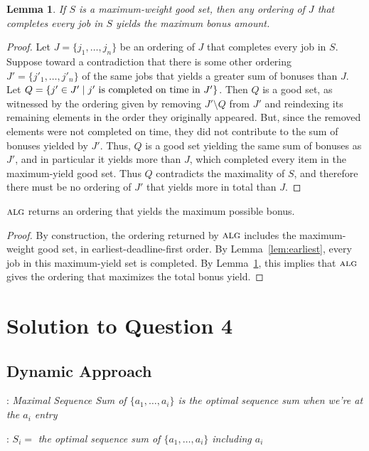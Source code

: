 \documentclass[11pt]{article}
\newcommand{\alg}{\textsc{alg}}
\newtheorem{lemma}[theorem]{Lemma}
\begin{document}
\begin{lemma}\label{lem:max-good-set}
  If $S$ is a maximum-weight good set, then any ordering of $J$ that completes every job in $S$ yields the maximum bonus amount.
\end{lemma}
\begin{proof}
  Let $J = \{j_1, \dots, j_n\}$ be an ordering of $J$ that completes every job in $S$.
  Suppose toward a contradiction that there is some other ordering $J' = \{j'_1, \dots, j'_n\}$ of the same jobs that yields a greater sum of bonuses than $J$.
  Let $Q = \{j' \in J' \mid j' \textnormal{ is completed on time in } J'\}$.
  Then $Q$ is a good set, as witnessed by the ordering given by removing $J' \setminus Q$ from $J'$ and reindexing its remaining elements in the order they originally appeared.
  But, since the removed elements were not completed on time, they did not contribute to the sum of bonuses yielded by $J'$.
  Thus, $Q$ is a good set yielding the same sum of bonuses as $J'$, and in particular it yields more than $J$, which completed every item in the maximum-yield good set.
  Thus $Q$ contradicts the maximality of $S$, and therefore there must be no ordering of $J'$ that yields more in total than $J$.
\end{proof}

 $\alg$ returns an ordering that yields the maximum possible bonus.
\begin{proof}
  By construction, the ordering returned by $\alg$ includes the maximum-weight good set, in earliest-deadline-first order.
  By Lemma~\ref{lem:earliest}, every job in this maximum-yield set is completed.
  By Lemma~\ref{lem:max-good-set}, this implies that $\alg$ gives the ordering that maximizes the total bonus yield.
\end{proof}

\section{Solution to Question 4}

\subsection{Dynamic Approach}
: {\it Maximal Sequence Sum of $\{a_1, \dots, a_i\}$ is the optimal sequence sum when we're at the $a_i$ entry}

  : $S_i = $ {\it the optimal sequence sum of $\{a_1, \dots, a_i\}$ including $a_i$}
\end{document}
